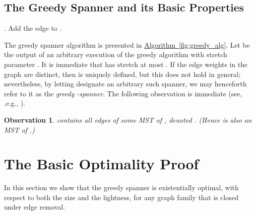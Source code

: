 \documentclass[11pt,letterpaper]{article}
\newtheorem{observation}[lemma]{Observation}
\newcommand{\namedref}[2]{\hyperref[#2]{#1~\ref*{#2}}}
\newcommand{\algref}[1]{\namedref{Algorithm}{#1}}
\begin{document}
\subsection{The Greedy Spanner and its Basic Properties}
\begin{algorithm}
	\caption{}\label{fig:greedy_alg}
	\begin{algorithmic}[1]
		\STATE .
		\IF {}
		\STATE Add the edge  to .
		\ENDIF
		\ENDFOR
	\end{algorithmic}
\end{algorithm}
The greedy spanner algorithm is presented in \algref{fig:greedy_alg}.
Let  be the output of an arbitrary execution of the greedy algorithm with stretch parameter .
It is immediate that  has stretch at most .
If the edge weights in the graph are distinct, then  is uniquely defined, but this does not hold in general;
nevertheless, by letting  designate an arbitrary such spanner, we may henceforth refer to it as the \emph{greedy -spanner}.
The following observation is immediate (see, .e.g., \cite{ENS14,CW18}).
\begin{observation}
	\label{fct:greedy contains MST}
	 contains all   edges of some MST of , denoted . (Hence  is also an MST of .)
\end{observation}



\section{The Basic Optimality Proof}\label{sec:Greedy_optimal}
In this section we show that the greedy spanner is existentially optimal, with respect to both the size and the lightness, for any graph family that is closed under edge removal.
\end{document}
